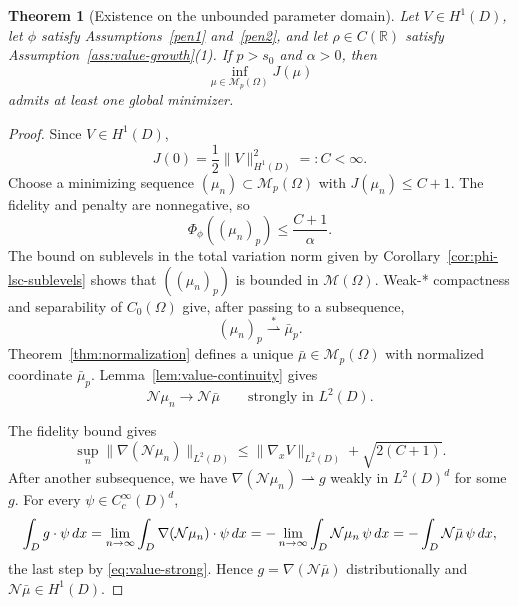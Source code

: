 \documentclass[11pt]{amsart}
\newtheorem{theorem}{Theorem}[section]
\theoremstyle{definition}
\theoremstyle{remark}
\let\div\relax
\DeclareMathOperator{\div}{div}
\begin{document}
\begin{theorem}[Existence on the unbounded parameter domain]
\label{thm:existence}
Let $V \in H^1(D)$, let $\phi$ satisfy Assumptions~\ref{pen1}
and~\ref{pen2}, and let $\rho\in C(\mathbb R)$ satisfy
Assumption~\ref{ass:value-growth}(1). If $p>s_0$ and $\alpha>0$, then
\begin{equation*}
	\inf_{\mu \in \mathcal{M}_p(\Omega)} J(\mu)
\end{equation*}
admits at least one global minimizer.
\end{theorem}
\begin{proof}
Since $V\in H^1(D)$,
\begin{equation*}
	J(0)=\frac12\|V\|_{H^1(D)}^2=:C<\infty.
\end{equation*}
Choose a minimizing sequence $(\mu_n)\subset\mathcal M_p(\Omega)$ with
$J(\mu_n)\le C+1$. The fidelity and penalty are nonnegative, so
\begin{equation*}
	\Phi_\phi((\mu_n)_p)\le\frac{C+1}{\alpha}.
\end{equation*}
The bound on sublevels in the total variation norm given by
Corollary~\ref{cor:phi-lsc-sublevels} shows that $((\mu_n)_p)$ is bounded in
$\mathcal M(\Omega)$. Weak-* compactness and separability of $C_0(\Omega)$
give, after passing to a subsequence,
\begin{equation*}
	(\mu_n)_p\overset{*}{\rightharpoonup}\bar\mu_p.
\end{equation*}
Theorem~\ref{thm:normalization} defines a unique
$\bar\mu\in\mathcal M_p(\Omega)$ with normalized coordinate $\bar\mu_p$.
Lemma~\ref{lem:value-continuity} gives
\begin{equation}
	\label{eq:value-strong}
	\mathcal{N}\mu_n \longrightarrow \mathcal{N}\bar{\mu}
	\qquad \text{strongly in } L^2(D).
\end{equation}

The fidelity bound gives
\begin{equation*}
	\sup_n\|\nabla(\mathcal N\mu_n)\|_{L^2(D)}
	\le\|\nabla_x V\|_{L^2(D)}+\sqrt{2(C+1)}.
\end{equation*}
After another subsequence, we have
$\nabla(\mathcal N\mu_n)\rightharpoonup g$ weakly in $L^2(D)^d$ for some $g$.
For every $\psi\in C_c^\infty(D)^d$,
\begin{align*}
	\int_D g \cdot \psi \, dx
	= \lim_{n\to\infty} \int_D \nabla(\mathcal{N}\mu_n)\cdot \psi \, dx
	= -\lim_{n\to\infty} \int_D \mathcal{N}\mu_n\,\div \psi \, dx
	= -\int_D \mathcal{N}\bar{\mu}\,\div \psi \, dx,
\end{align*}
the last step by \eqref{eq:value-strong}. Hence
$g = \nabla(\mathcal{N}\bar{\mu})$ distributionally and
$\mathcal{N}\bar{\mu} \in H^1(D)$.


\end{proof}
\end{document}
